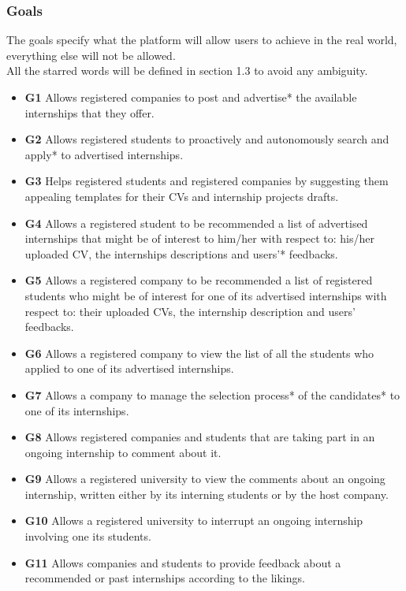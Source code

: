 \documentclass{article}
\begin{document}
\subsubsection{Goals}
The goals specify what the platform will allow users to achieve in the real world, everything else will not be allowed. 
\\All the starred words will be defined in section 1.3 to avoid any ambiguity.
\begin{itemize}
  \item \textbf{G1} Allows registered companies to post and advertise* the available internships that they offer.
  \item \textbf{G2} Allows registered students to proactively and autonomously search and apply* to advertised internships.
  \item \textbf{G3} Helps registered students and registered companies by suggesting them appealing templates for their CVs and internship projects drafts.
  \item \textbf{G4} Allows a registered student to be recommended a list of advertised internships that might be of interest to him/her with respect to: his/her uploaded CV, the internships descriptions and users'* feedbacks.
  \item \textbf{G5} Allows a registered company to be recommended a list of registered students who might be of interest for one of its advertised internships with respect to: their uploaded CVs, the internship description and users' feedbacks.
  \item \textbf{G6} Allows a registered company to view the list of all the students who applied to one of its advertised internships.
  \item \textbf{G7} Allows a company to manage the selection process* of the candidates* to one of its internships.
  \item \textbf{G8} Allows registered companies and students that are taking part in an ongoing internship to comment about it.
  \item \textbf{G9} Allows a registered university to view the comments about an ongoing internship, written either by its interning students or by the host company.
  \item \textbf{G10} Allows a registered university to interrupt an ongoing internship involving one its students.
  \item \textbf{G11} Allows companies and students to provide feedback about a recommended or past internships according to the likings.

\end{itemize}
\end{document}
